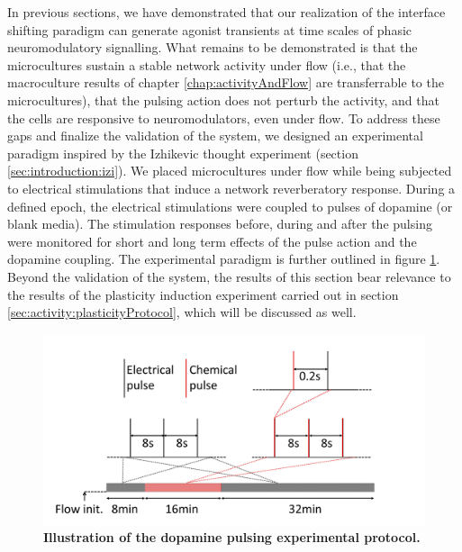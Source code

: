 In previous sections, we have demonstrated that our realization of the interface shifting paradigm can generate agonist transients at time scales of phasic neuromodulatory signalling. What remains to be demonstrated is that the microcultures sustain a stable network activity under flow (i.e., that the macroculture results of chapter \ref{chap:activityAndFlow} are transferrable to the microcultures), that the pulsing action does not perturb the activity, and that the cells are responsive to neuromodulators, even under flow. To address these gaps and finalize the validation of the system, we designed an experimental paradigm inspired by the Izhikevic thought experiment (section \ref{sec:introduction:izi}). We placed microcultures under flow while being subjected to electrical stimulations that induce a network reverberatory response. During a defined epoch, the electrical stimulations were coupled to pulses of dopamine (or blank media). The stimulation responses before, during and after the pulsing were monitored for short and long term effects of the pulse action and the dopamine coupling. The experimental paradigm is further outlined in figure \ref{fig:pulses:expOutline}. Beyond the validation of the system, the results of this section bear relevance to the results of the plasticity induction experiment carried out in section \ref{sec:activity:plasticityProtocol}, which will be discussed as well.

  \begin{figure}[h]
       \centering
       \includegraphics[width=15cm]{chapter6/figures/ExpOutline/dopamineExpOutline1.jpg}
       \caption[Illustration of the dopamine pulsing experimental protocol]{\textbf{Illustration of the dopamine pulsing experimental protocol.}}
       \label{fig:pulses:expOutline}

   \end{figure}


